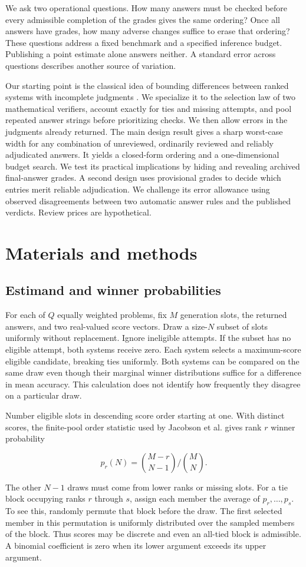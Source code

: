 \documentclass[10pt,letterpaper]{article}
\begin{document}
We ask two operational questions. How many answers must be checked before every admissible completion of the grades gives the same ordering? Once all answers have grades, how many adverse changes suffice to erase that ordering? These questions address a fixed benchmark and a specified inference budget. Publishing a point estimate alone answers neither. A standard error across questions describes another source of variation.

Our starting point is the classical idea of bounding differences between ranked systems with incomplete judgments \cite{carterette,tan}. We specialize it to the selection law of two mathematical verifiers, account exactly for ties and missing attempts, and pool repeated answer strings before prioritizing checks. We then allow errors in the judgments already returned. The main design result gives a sharp worst-case width for any combination of unreviewed, ordinarily reviewed and reliably adjudicated answers. It yields a closed-form ordering and a one-dimensional budget search. We test its practical implications by hiding and revealing archived final-answer grades. A second design uses provisional grades to decide which entries merit reliable adjudication. We challenge its error allowance using observed disagreements between two automatic answer rules and the published verdicts. Review prices are hypothetical.

\section*{Materials and methods}
\subsection*{Estimand and winner probabilities}
For each of $Q$ equally weighted problems, fix $M$ generation slots, the returned answers, and two real-valued score vectors. Draw a size-$N$ subset of slots uniformly without replacement. Ignore ineligible attempts. If the subset has no eligible attempt, both systems receive zero. Each system selects a maximum-score eligible candidate, breaking ties uniformly. Both systems can be compared on the same draw even though their marginal winner distributions suffice for a difference in mean accuracy. This calculation does not identify how frequently they disagree on a particular draw.

Number eligible slots in descending score order starting at one. With distinct scores, the finite-pool order statistic used by Jacobson et al. \cite{jacobson} gives rank $r$ winner probability
\begin{linenomath}
\[
 p_r(N)=\binom{M-r}{N-1}\big/\binom{M}{N}.
\]
\end{linenomath}
The other $N-1$ draws must come from lower ranks or missing slots. For a tie block occupying ranks $r$ through $s$, assign each member the average of $p_r,\ldots,p_s$. To see this, randomly permute that block before the draw. The first selected member in this permutation is uniformly distributed over the sampled members of the block. Thus scores may be discrete and even an all-tied block is admissible. A binomial coefficient is zero when its lower argument exceeds its upper argument.
\end{document}
